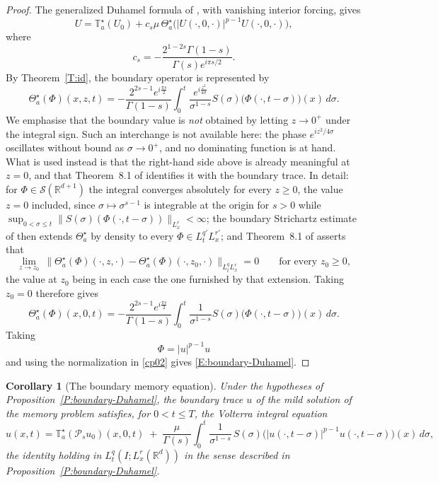 \documentclass[11pt,letter]{amsart}
\def \R {\mathbb{R}}
\def \G{\Gamma}
\newcommand{\Rd}{\mathbb R^d}
\numberwithin{equation}{section}
\newtheorem{corollary}[theorem]{Corollary}
\numberwithin{equation}{section}
\begin{document}
\begin{proof}
The generalized Duhamel formula of \cite{GS2}, with vanishing
interior forcing, gives
\begin{equation}\label{E:bulk-Duhamel}
U
=
\mathbb T_a^\star(U_0)
+
c_s\mu\,
\Theta_a^\star
\bigl(
|U(\cdot,0,\cdot)|^{p-1}U(\cdot,0,\cdot)
\bigr),
\end{equation}
where
\[
c_s
=
-\frac{2^{1-2s}\G(1-s)}
{\G(s)e^{i\pi s/2}}.
\]
By Theorem~\ref{T:id}, the boundary operator is represented by
\[
\Theta_a^\star(\Phi)(x,z,t)
=
-\frac{2^{2s-1}e^{i\frac{\pi s}{2}}}{\G(1-s)}
\int_0^t
\frac{e^{i\frac{z^2}{4\sigma}}}{\sigma^{1-s}}
S(\sigma)
\bigl(\Phi(\cdot,t-\sigma)\bigr)(x)\,d\sigma.
\]
We emphasise that the boundary value is \emph{not} obtained by letting
$z\to0^+$ under the integral sign. Such an interchange is not available here:
the phase $e^{iz^2/4\sigma}$ oscillates without bound as $\sigma\to0^+$, and no
dominating function is at hand. What is used instead is that the right-hand
side above is already meaningful at $z=0$, and that Theorem~8.1 of \cite{GS2}
identifies it with the boundary trace. In detail: for
$\Phi\in\mathscr S(\R^{d+1})$ the integral converges absolutely for every
$z\ge0$, the value $z=0$ included, since $\sigma\mapsto\sigma^{s-1}$ is
integrable at the origin for $s>0$ while
$\sup_{0<\sigma\le t}\|S(\sigma)(\Phi(\cdot,t-\sigma))\|_{L^r_x}<\infty$; the
boundary Strichartz estimate of \cite[Theorem~7.4]{GS2} then extends
$\Theta_a^\star$ by density to every $\Phi\in L^{q'}_tL^{r'}_x$; and
Theorem~8.1 of \cite{GS2} asserts that
\[
\lim_{z\to z_0}\
\bigl\|\Theta_a^\star(\Phi)(\cdot,z,\cdot)-\Theta_a^\star(\Phi)(\cdot,z_0,\cdot)
\bigr\|_{L^q_tL^r_x}=0
\qquad\text{for every } z_0\ge0,
\]
the value at $z_0$ being in each case the one furnished by that extension.
Taking $z_0=0$ therefore gives
\[
\Theta_a^\star(\Phi)(x,0,t)
=
-\frac{2^{2s-1}e^{i\frac{\pi s}{2}}}{\G(1-s)}
\int_0^t
\frac{1}{\sigma^{1-s}}
S(\sigma)
\bigl(\Phi(\cdot,t-\sigma)\bigr)(x)\,d\sigma.
\]
Taking
\[
\Phi=|u|^{p-1}u
\]
and using the normalization in \eqref{cp02} gives
\eqref{E:boundary-Duhamel}.
\end{proof}

\begin{corollary}[The boundary memory equation]\label{C:volterra}
Under the hypotheses of Proposition~\ref{P:boundary-Duhamel}, the boundary
trace $u$ of the mild solution of the memory problem satisfies, for $0<t\le T$,
the Volterra integral equation
\begin{equation}\label{E:volterra}
u(x,t)
=
\mathbb T_a^\star(\mathcal P_su_0)(x,0,t)
\;+\;
\frac{\mu}{\G(s)}
\int_0^t
\frac{1}{\sigma^{1-s}}\,
S(\sigma)\bigl(|u(\cdot,t-\sigma)|^{p-1}u(\cdot,t-\sigma)\bigr)(x)\,d\sigma ,
\end{equation}
the identity holding in $L^q_t(I;L^r_x(\Rd))$ in the sense described in
Proposition~\ref{P:boundary-Duhamel}.
\end{corollary}
\end{document}
